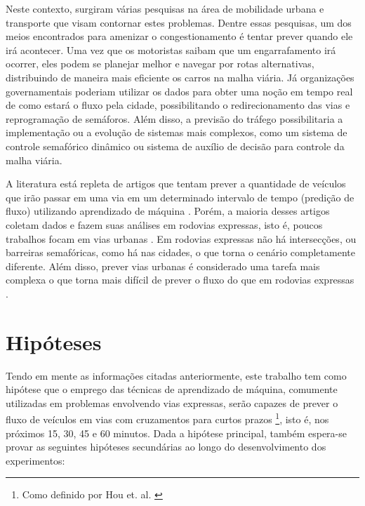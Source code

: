 Neste contexto, surgiram várias pesquisas na área de mobilidade urbana e transporte que visam contornar estes problemas. Dentre essas pesquisas, um dos meios encontrados para amenizar o congestionamento é tentar prever quando ele irá acontecer. Uma vez que os motoristas saibam que um engarrafamento irá ocorrer, eles podem se planejar melhor e navegar por rotas alternativas, distribuindo de maneira mais eficiente os carros na malha viária. Já organizações governamentais poderiam utilizar os dados para obter uma noção em tempo real de como estará o fluxo pela cidade, possibilitando o redirecionamento das vias e reprogramação de semáforos. Além disso, a previsão do tráfego possibilitaria a implementação ou a evolução de sistemas mais complexos, como um sistema de controle semafórico dinâmico ou sistema de auxílio de decisão para controle da malha viária.

A literatura está repleta de artigos que tentam prever a quantidade de veículos que irão passar em uma via em um determinado intervalo de tempo (predição de fluxo) utilizando aprendizado de máquina \cite{doi:10.1080/01441647.2014.992496, fu2016using, hamed_prediction_1995, lv_6894591, Seoul, wang_2018, Xiaolei_2015, Zainab_2018}. Porém, a maioria desses artigos coletam dados e fazem suas análises em rodovias expressas, isto é, poucos trabalhos focam em vias urbanas \cite{lana_2018}. Em rodovias expressas não há intersecções, ou barreiras semafóricas, como há nas cidades, o que torna o cenário completamente diferente. Além disso, prever vias urbanas é considerado uma tarefa mais complexa o que torna mais difícil de prever o fluxo do que em rodovias expressas \cite{lana_2018}.

\section{Hipóteses}
\label{chapter:hipoteses}
Tendo em mente as informações citadas anteriormente, este trabalho tem como hipótese que o emprego das técnicas de aprendizado de máquina, comumente utilizadas em problemas envolvendo vias expressas, serão capazes de prever o fluxo de veículos em vias com cruzamentos para curtos prazos \footnote{Como definido por Hou et. al. \cite{hou2014traffic}}, isto é, nos próximos 15, 30, 45 e 60 minutos. Dada a hipótese principal, também espera-se provar as seguintes hipóteses secundárias ao longo do desenvolvimento dos experimentos:

